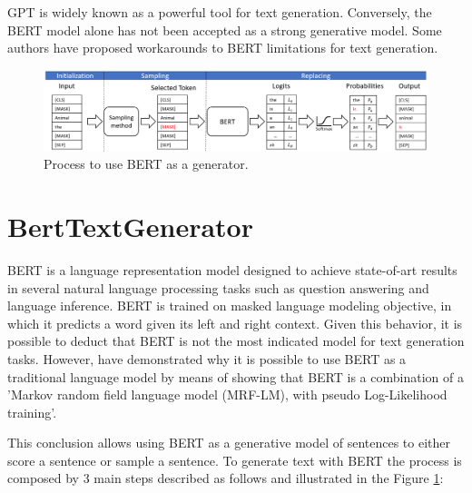 \documentclass[10pt,twocolumn,letterpaper]{article}
\begin{document}
GPT is widely known as a powerful tool for text generation.
Conversely, the BERT model alone has not been accepted as a strong generative model.
Some authors \cite{wang2019bert} have proposed workarounds to BERT limitations for text generation.

\begin{figure}[t]
   \centering
   \includegraphics[scale=0.6]{BERTfunc.PNG}
   \caption{Process to use BERT as a generator.}
   \label{fig:BertFig}
\end{figure}

\section{BertTextGenerator}
BERT is a language representation model designed to achieve state-of-art results
in several natural language processing tasks such as question answering and language inference.
BERT is trained on masked language modeling objective, in which it predicts a word given its
left and right context.
Given this behavior, it is possible to deduct that BERT is not the most
indicated model for text generation tasks.
However, \cite{wang2019bert} have demonstrated why it is possible to use BERT as a traditional
language model by means of showing that BERT is a combination of a 'Markov random field
language model (MRF-LM), with pseudo Log-Likelihood training'.

This conclusion allows using BERT as a generative model of sentences to either score a sentence or
sample a sentence.
To generate text with BERT the process is composed by 3 main steps described as follows and illustrated in the Figure \ref{fig:BertFig}:
\end{document}
